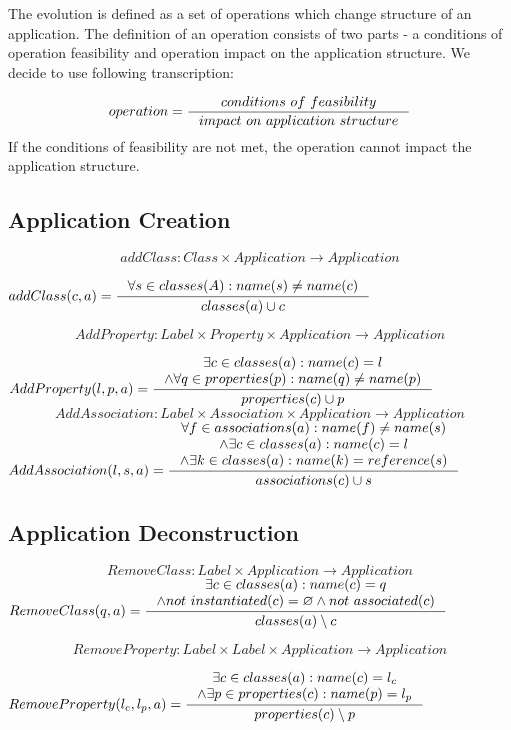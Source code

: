 \documentclass[11pt]{article}
\begin{document}
The evolution is defined as a set of operations which change structure of an application. The definition of an operation consists of two parts - a conditions of operation feasibility and operation impact on the application structure. We decide to use following transcription:

$$
operation = \inference{conditions$ $of$ $feasibility}{impact$ $on$ $application$ $structure}
$$
If the conditions of feasibility are not met, the operation cannot impact the application structure.


\subsection{Application Creation}
$$addClass: Class \times Application \rightarrow Application $$

$
addClass(c, a) = \inference{\forall s \in classes(A) : name(s) \neq name(c)}
{classes(a) \cup c}
$

$$AddProperty : Label \times Property \times Application \rightarrow Application $$

$
AddProperty(l, p, a) = \inference{\exists c \in classes(a) : name(c) = l \\ \wedge \forall q \in properties(p) : name(q) \neq name(p)}{
 properties(c) \cup p }
$
$$AddAssociation : Label \times Association \times Application \rightarrow Application $$
$
AddAssociation(l, s, a) = \inference{\forall f \in associations(a) : name(f) \neq name(s) \\ \wedge \exists c \in classes(a) : name(c) = l \\ \wedge \exists k \in classes(a) : name(k) = reference(s) }{associations(c) \cup s}
$

\subsection{Application Deconstruction}
$$RemoveClass: Label \times Application \rightarrow Application $$
$
RemoveClass(q, a) = \inference{\exists c \in classes(a) : name(c) = q \\
\wedge not$ $instantiated(c) = \varnothing \wedge not$ $associated(c)}{classes(a) \setminus c }
$

$$RemoveProperty: Label \times Label \times Application \rightarrow Application $$

$
RemoveProperty(l_c, l_p, a) = \inference{\exists c \in classes(a) : name(c) = l_c \\ \wedge \exists p \in properties(c) : name(p) = l_p}{properties(c) \setminus p }
$
\end{document}
